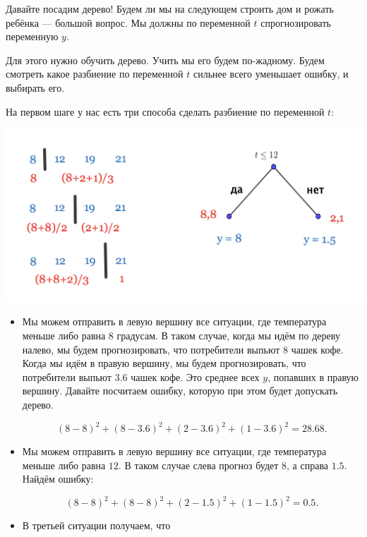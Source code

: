 \documentclass[12pt, a4paper, oneside]{article}
\theoremstyle{plain} %
\theoremstyle{definition}
\begin{document}
\begin{solution}
Давайте посадим дерево! Будем ли мы на следующем строить дом и рожать ребёнка --- большой вопрос.  Мы должны по переменной $t$ спрогнозировать переменную $y$. 

Для этого нужно обучить дерево. Учить мы его будем по-жадному. Будем смотреть какое разбиение по переменной $t$ сильнее всего уменьшает ошибку, и выбирать его. 
	
На первом шаге у нас есть три способа сделать разбиение по переменной $t$: 

\begin{center}
    \includegraphics[scale=0.25]{reg_tree_1.png}
\end{center}
	
\begin{itemize}

    \item  	Мы можем отправить  в левую вершину все ситуации, где температура меньше либо равна 8 градусам. В таком случае, когда мы идём по дереву налево, мы будем прогнозировать, что потребители выпьют $8$ чашек кофе. Когда мы идём в правую вершину, мы будем прогнозировать, что потребители выпьют $3.6$ чашек кофе. Это среднее всех $y$, попавших в правую вершину. Давайте посчитаем ошибку, которую при этом будет допускать дерево. 

	$$
	(8 - 8)^2 + (8 - 3.6)^2 + (2 - 3.6)^2 + (1 - 3.6)^2 = 28.68.
	$$

	\item Мы можем отправить в левую вершину все ситуации, где температура меньше либо равна $12$. В таком случае слева прогноз будет $8$, а справа $1.5$. Найдём ошибку:
	
	$$
	(8 - 8)^2 + (8 - 8)^2 + (2 - 1.5)^2 + (1 - 1.5)^2 = 0.5.  $$
	
	\item В третьей ситуации получаем, что 
	

\end{itemize}
\end{solution}
\end{document}
